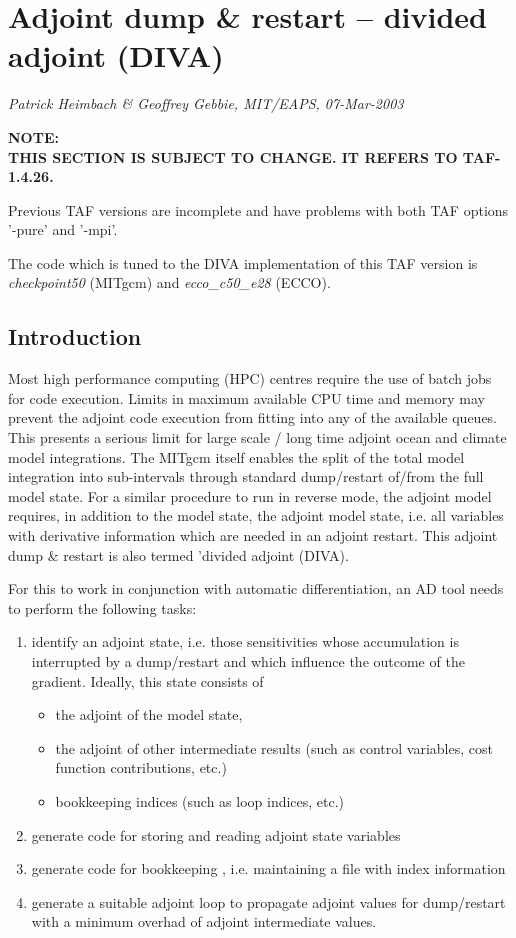 
\section{Adjoint dump \& restart -- divided adjoint (DIVA)
\label{sec_ad_diva}}

{\it Patrick Heimbach \& Geoffrey Gebbie, MIT/EAPS, 07-Mar-2003}

{\bf 
NOTE: \\
THIS SECTION IS SUBJECT TO CHANGE.
IT REFERS TO TAF-1.4.26.

Previous TAF versions are incomplete and have problems 
with both TAF options '-pure' and '-mpi'.

The code which is tuned to the DIVA implementation 
of this TAF version
is {\it checkpoint50} (MITgcm) and {\it ecco\_c50\_e28} (ECCO).
}

\subsection{Introduction}

Most high performance computing (HPC) centres require the use
of batch jobs for code execution. 
Limits in maximum available CPU time and memory may prevent
the adjoint code execution from fitting into any of the available
queues. This presents a serious limit for large scale /
long time adjoint ocean and climate model integrations.
The MITgcm itself enables the split of the total model 
integration into sub-intervals through standard dump/restart 
of/from the full model state.
For a similar procedure to run in reverse mode,
the adjoint model requires, in addition to the model state, 
the adjoint model state,
i.e. all variables with derivative information
which are needed in an adjoint restart.
This adjoint dump \& restart is also termed 'divided adjoint (DIVA).

For this to work in conjunction with automatic differentiation, 
an AD tool needs to perform the following tasks:
%
\begin{enumerate}
%
\item
%
identify an adjoint state, i.e. those sensitivities whose
accumulation is interrupted by a dump/restart and which influence
the outcome of the gradient.
Ideally, this state consists of 
%
\begin{itemize}
%
\item
the adjoint of the model state,
%
\item
the adjoint of other intermediate results (such as control variables,
cost function contributions, etc.)
%
\item
bookkeeping indices (such as loop indices, etc.)
%
\end{itemize}
%
\item
%
generate code for storing and reading adjoint state variables
%
\item
generate code for bookkeeping , i.e. maintaining a file
with index information
%
\item
generate a suitable adjoint loop to propagate adjoint values
for dump/restart with a minimum overhad of adjoint intermediate
values.
%
\end{enumerate}

